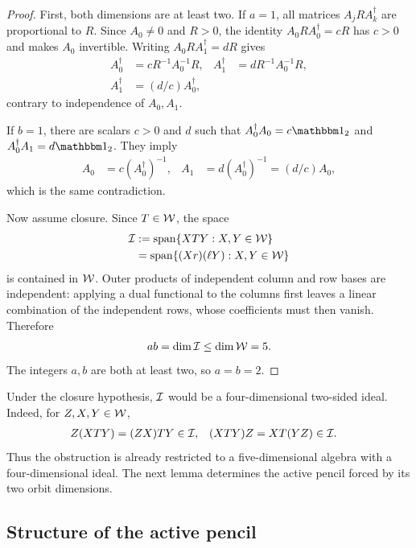 \begin{proof}
	First, both dimensions are at least two. If $a=1$, all matrices
	$A_jRA_k^\dagger$ are proportional to $R$.
	Since $A_0\neq0$ and $R>0$, the identity
	$A_0RA_0^\dagger=cR$ has $c>0$ and makes $A_0$ invertible.
	Writing $A_0RA_1^\dagger=dR$ gives
	\begin{align}
		A_0^\dagger & =cR^{-1}A_0^{-1}R,
		            &
		A_1^\dagger & =dR^{-1}A_0^{-1}R,
		\nonumber                        \\
		A_1^\dagger & =(d/c)A_0^\dagger,
	\end{align}
	contrary to independence of $A_0,A_1$.

	If $b=1$, there are scalars $c>0$ and $d$ such that
	$A_0^\dagger A_0=c\Id_2$ and $A_0^\dagger A_1=d\Id_2$.
	They imply
	\begin{align}
		A_0 & =c(A_0^\dagger)^{-1},
		    &
		A_1 & =d(A_0^\dagger)^{-1}
		=(d/c)A_0,
	\end{align}
	which is the same contradiction.

	Now assume closure. Since $T\in\mathcal{W}$, the space
	\begin{align}
		\mathcal{I}
		 & :=\operatorname{span}\{XTY:X,Y\in\mathcal{W}\}
		\nonumber                                   \\
		 & =\operatorname{span}
		\{(Xr)(\ell Y):X,Y\in\mathcal{W}\}
		\label{eq:ideal}
	\end{align}
	is contained in $\mathcal{W}$.
	Outer products of independent column and row bases are independent:
	applying a dual functional to the columns first leaves a linear
	combination of the independent rows, whose coefficients must then
	vanish. Therefore
	\begin{align}
		ab=\dim\mathcal{I}\leq\dim\mathcal{W}=5.
	\end{align}
	The integers $a,b$ are both at least two, so $a=b=2$.
\end{proof}

Under the closure hypothesis, $\mathcal{I}$ would be a four-dimensional
two-sided ideal. Indeed, for $Z,X,Y\in\mathcal{W}$,
\begin{align}
	Z(XTY) & =(ZX)TY\in\mathcal{I},
	       &
	(XTY)Z & =XT(YZ)\in\mathcal{I}.
\end{align}
Thus the obstruction is already restricted to a five-dimensional
algebra with a four-dimensional ideal. The next lemma determines
the active pencil forced by its two orbit dimensions.

\subsection{Structure of the active pencil}

